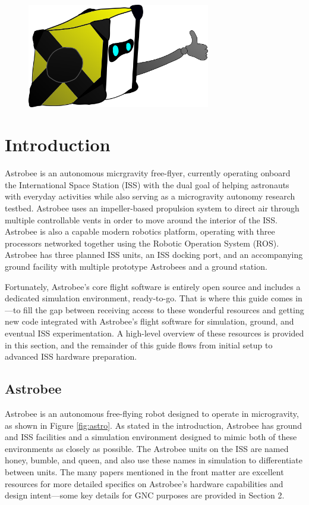 \documentclass{article}
\begin{document}
\vspace{1cm}
\begin{figure}[hb!]
    \centering
    \includegraphics[width=8cm]{img/astrobee_mascot.png}
\end{figure}
\newpage

\tableofcontents

\newpage

\section{Introduction}

Astrobee is an autonomous micrgravity free-flyer, currently operating onboard the International Space Station (ISS) with the dual goal of helping astronauts with everyday activities while also serving as a microgravity autonomy research testbed. Astrobee uses an impeller-based propulsion system to direct air through multiple controllable vents in order to move around the interior of the ISS. Astrobee is also a capable modern robotics platform, operating with three processors networked together using the Robotic Operation System (ROS). Astrobee has three planned ISS units, an ISS docking port, and an accompanying ground facility with multiple prototype Astrobees and a ground station.

Fortunately, Astrobee's core flight software is entirely open source and includes a dedicated simulation environment, ready-to-go. That is where this guide comes in---to fill the gap between receiving access to these wonderful resources and getting new code integrated with Astrobee's flight software for simulation, ground, and eventual ISS experimentation. A high-level overview of these resources is provided in this section, and the remainder of this guide flows from initial setup to advanced ISS hardware preparation.

\subsection{Astrobee}
Astrobee is an autonomous free-flying robot designed to operate in microgravity, as shown in Figure \ref{fig:astro}. As stated in the introduction, Astrobee has ground and ISS facilities and a simulation environment designed to mimic both of these environments as closely as possible. The Astrobee units on the ISS are named honey, bumble, and queen, and also use these names in simulation to differentiate between units. The many papers mentioned in the front matter are excellent resources for more detailed specifics on Astrobee's hardware capabilities and design intent---some key details for GNC purposes are provided in Section 2.
\end{document}
